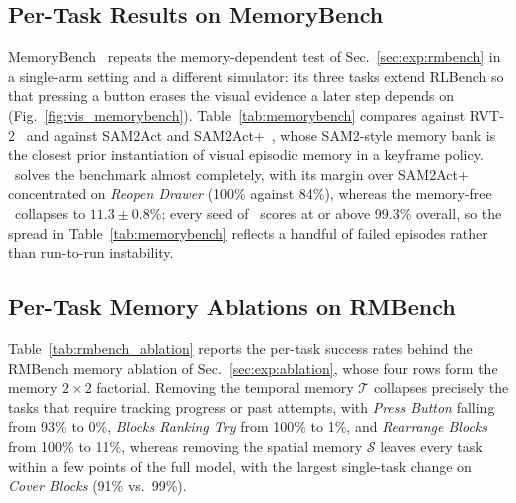\subsection{Per-Task Results on MemoryBench}
\label{app:memorybench_results}

MemoryBench~\cite{fang2025sam2act} repeats the memory-dependent test of
Sec.~\ref{sec:exp:rmbench} in a single-arm setting and a different
simulator: its three tasks extend RLBench so that pressing a button
erases the visual evidence a later step depends on
(Fig.~\ref{fig:vis_memorybench}).
Table~\ref{tab:memorybench} compares against RVT-2~\cite{goyal2024rvt}
and against SAM2Act and SAM2Act+~\cite{fang2025sam2act}, whose
SAM2-style memory bank is the closest prior instantiation of visual
episodic memory in a keyframe policy.
\memmethod\ solves the benchmark almost completely, with its margin
over SAM2Act+ concentrated on \emph{Reopen Drawer} (100\% against
84\%), whereas the memory-free \method\ collapses to
$11.3{\pm}0.8\%$; every seed of \memmethod\ scores at or above 99.3\%
overall, so the spread in Table~\ref{tab:memorybench} reflects a
handful of failed episodes rather than run-to-run instability.

\subsection{Per-Task Memory Ablations on RMBench}
\label{app:rmbench_ablation}

Table~\ref{tab:rmbench_ablation} reports the per-task success rates
behind the RMBench memory ablation of Sec.~\ref{sec:exp:ablation},
whose four rows form the memory $2{\times}2$ factorial.
Removing the temporal memory $\mathcal{T}$ collapses precisely the
tasks that require tracking progress or past attempts, with \emph{Press
Button} falling from 93\% to 0\%, \emph{Blocks Ranking Try} from 100\%
to 1\%, and \emph{Rearrange Blocks} from 100\% to 11\%, whereas
removing the spatial memory $\mathcal{S}$ leaves every task within a
few points of the full model, with the largest single-task change on
\emph{Cover Blocks} (91\% vs.\ 99\%).


